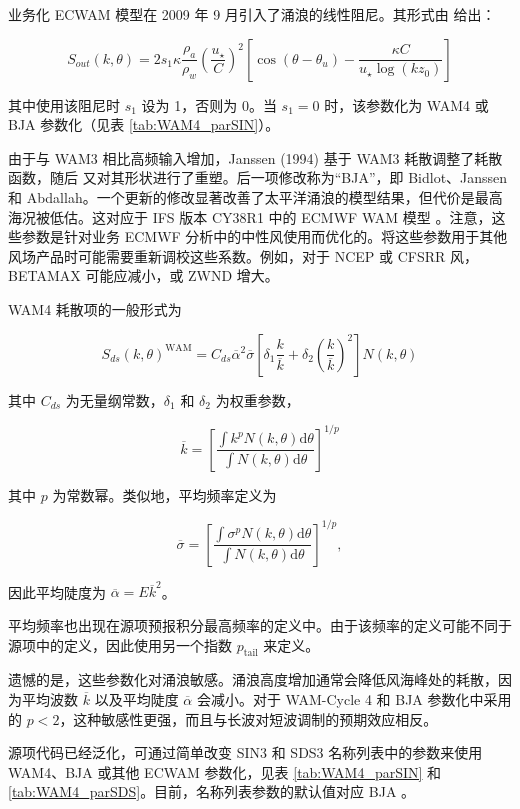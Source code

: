 业务化 ECWAM 模型在 2009 年 9 月引入了涌浪的线性阻尼。其形式由 \cite{bk:Jan04} 给出：

\begin{equation}
S_{out}(k,\theta)= 2 s_1  \kappa \frac{\rho_a }{\rho_w} \left(\frac{u_\star}{C}\right)^2 
\left[\cos \left(\theta - \theta_u\right) - \frac{\kappa C}{u_\star \log(k z_0)}\right]
\end{equation}

\noindent 其中使用该阻尼时 $s_1$ 设为 1，否则为 0。当 $s_1=0$ 时，该参数化为 WAM4 或 BJA 参数化（见表 \ref{tab:WAM4_parSIN}）。

由于与 WAM3 相比高频输入增加，Janssen (1994) 基于 WAM3 耗散调整了耗散函数，随后 \cite{rep:Bea05} 又对其形状进行了重塑。后一项修改称为“BJA”，即 Bidlot、Janssen 和 Abdallah。一个更新的修改显著改善了太平洋涌浪的模型结果，但代价是最高海况被低估。这对应于 IFS 版本 CY38R1 中的 ECMWF WAM 模型 \citep{pro:Bid12}。注意，这些参数是针对业务 ECMWF 分析中的中性风使用而优化的。将这些参数用于其他风场产品时可能需要重新调校这些系数。例如，对于 NCEP 或 CFSRR 风，BETAMAX 可能应减小，或 ZWND 增大。


WAM4 耗散项的一般形式为

\begin{equation}
S_{ds}\left(k,\theta\right)^{\mathrm{WAM}} = C_{ds} \overline{\alpha}^2
 \overline{\sigma} \left[\delta_1 \frac{k}{\overline{k}} + \delta_2
\left(\frac{k}{\overline{k}}\right)^2\right]\label{eq:SdsWAM4}
N\left(k,\theta\right)
\end{equation}

\noindent
其中 $C_{ds}$ 为无量纲常数，$\delta_1$ 和 $\delta_2$ 为权重参数，

\begin{equation}
\overline{k}=\left[\frac{\int k^p N\left(k,\theta\right) {\mathrm d}
\theta}{\int N\left(k,\theta\right) {\mathrm d} \theta}\right]^{1/p}
\end{equation}

\noindent
其中 $p$ 为常数幂。类似地，平均频率定义为

\begin{equation}
\overline{\sigma}=\left[\frac{\int \sigma^p N\left(k,\theta\right) {\mathrm d}
\theta}{ \int N\left(k,\theta\right) {\mathrm d} \theta}\right]^{1/p},
\end{equation}

\noindent
因此平均陡度为 $\overline{\alpha}=E \overline{k}^2$。

平均频率也出现在源项预报积分最高频率的定义中。由于该频率的定义可能不同于源项中的定义，因此使用另一个指数 $p_{\mathrm{tail}}$ 来定义。

遗憾的是，这些参数化对涌浪敏感。涌浪高度增加通常会降低风海峰处的耗散，因为平均波数 $\overline{k}$ 以及平均陡度 $\overline{\alpha}$ 会减小。对于 WAM-Cycle 4 和 BJA 参数化中采用的 $p< 2$，这种敏感性更强，而且与长波对短波调制的预期效应相反。

源项代码已经泛化，可通过简单改变 {\F SIN3} 和 {\F SDS3} 名称列表中的参数来使用 WAM4、BJA 或其他 ECWAM 参数化，见表 \ref{tab:WAM4_parSIN} 和 \ref{tab:WAM4_parSDS}。目前，名称列表参数的默认值对应 BJA \citep{rep:Bea05}。
